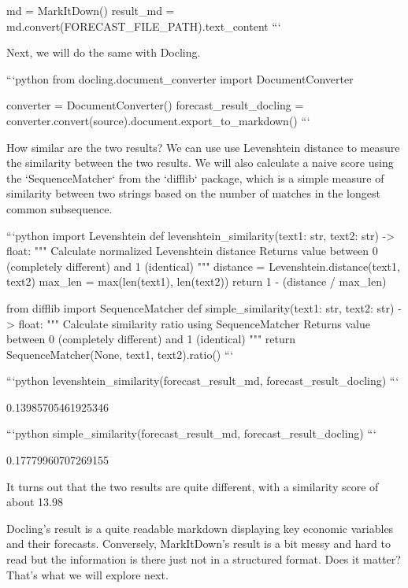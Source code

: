 md = MarkItDown()
result_md = md.convert(FORECAST_FILE_PATH).text_content
```

Next, we will do the same with Docling.


```python
from docling.document_converter import DocumentConverter

converter = DocumentConverter()
forecast_result_docling = converter.convert(source).document.export_to_markdown()
```

How similar are the two results? We can use use Levenshtein distance to measure the similarity between the two results. We will also calculate a naive score using the `SequenceMatcher` from the `difflib` package, which is a simple measure of similarity between two strings based on the number of matches in the longest common subsequence.


```python
import Levenshtein
def levenshtein_similarity(text1: str, text2: str) -> float:
    """
    Calculate normalized Levenshtein distance
    Returns value between 0 (completely different) and 1 (identical)
    """
    distance = Levenshtein.distance(text1, text2)
    max_len = max(len(text1), len(text2))
    return 1 - (distance / max_len)

from difflib import SequenceMatcher
def simple_similarity(text1: str, text2: str) -> float:
    """
    Calculate similarity ratio using SequenceMatcher
    Returns value between 0 (completely different) and 1 (identical)
    """
    return SequenceMatcher(None, text1, text2).ratio()
```


```python
levenshtein_similarity(forecast_result_md, forecast_result_docling)
```




    0.13985705461925346




```python
simple_similarity(forecast_result_md, forecast_result_docling)
```




    0.17779960707269155



It turns out that the two results are quite different, with a similarity score of about 13.98%

Docling's result is a quite readable markdown displaying key economic variables and their forecasts. Conversely, MarkItDown's result is a bit messy and hard to read but the information is there just not in a structured format. Does it matter? That's what we will explore next.

